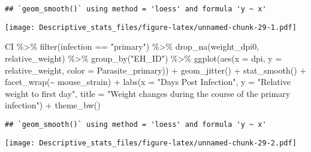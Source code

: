 \documentclass[
]{article}
\newenvironment{Shaded}{\begin{snugshade}}{\end{snugshade}}
\newcommand{\AttributeTok}[1]{\textcolor[rgb]{0.77,0.63,0.00}{#1}}
\newcommand{\FunctionTok}[1]{\textcolor[rgb]{0.00,0.00,0.00}{#1}}
\newcommand{\NormalTok}[1]{#1}
\newcommand{\SpecialCharTok}[1]{\textcolor[rgb]{0.00,0.00,0.00}{#1}}
\newcommand{\StringTok}[1]{\textcolor[rgb]{0.31,0.60,0.02}{#1}}
\begin{document}
\begin{verbatim}
## `geom_smooth()` using method = 'loess' and formula 'y ~ x'
\end{verbatim}

\texttt{[image: Descriptive\_stats\_files/figure-latex/unnamed-chunk-29-1.pdf]}

\begin{Shaded}
\begin{Highlighting}[]
\NormalTok{CI }\SpecialCharTok{\%\textgreater{}\%} 
    \FunctionTok{filter}\NormalTok{(infection }\SpecialCharTok{==} \StringTok{"primary"}\NormalTok{) }\SpecialCharTok{\%\textgreater{}\%}
    \FunctionTok{drop\_na}\NormalTok{(weight\_dpi0, relative\_weight) }\SpecialCharTok{\%\textgreater{}\%}
    \FunctionTok{group\_by}\NormalTok{(}\StringTok{"EH\_ID"}\NormalTok{) }\SpecialCharTok{\%\textgreater{}\%}
    \FunctionTok{ggplot}\NormalTok{(}\FunctionTok{aes}\NormalTok{(}\AttributeTok{x =}\NormalTok{ dpi, }\AttributeTok{y =}\NormalTok{ relative\_weight, }\AttributeTok{color =}\NormalTok{ Parasite\_primary)) }\SpecialCharTok{+}
    \FunctionTok{geom\_jitter}\NormalTok{() }\SpecialCharTok{+}
    \FunctionTok{stat\_smooth}\NormalTok{() }\SpecialCharTok{+}
    \FunctionTok{facet\_wrap}\NormalTok{(}\SpecialCharTok{\textasciitilde{}}\NormalTok{ mouse\_strain) }\SpecialCharTok{+}
    \FunctionTok{labs}\NormalTok{(}\AttributeTok{x =} \StringTok{"Days Post Infection"}\NormalTok{, }\AttributeTok{y =} \StringTok{"Relative weight to first day"}\NormalTok{,}
         \AttributeTok{title =} \StringTok{"Weight changes during the course of the primary infection"}\NormalTok{) }\SpecialCharTok{+}
    \FunctionTok{theme\_bw}\NormalTok{()}
\end{Highlighting}
\end{Shaded}

\begin{verbatim}
## `geom_smooth()` using method = 'loess' and formula 'y ~ x'
\end{verbatim}

\texttt{[image: Descriptive\_stats\_files/figure-latex/unnamed-chunk-29-2.pdf]}
\end{document}
